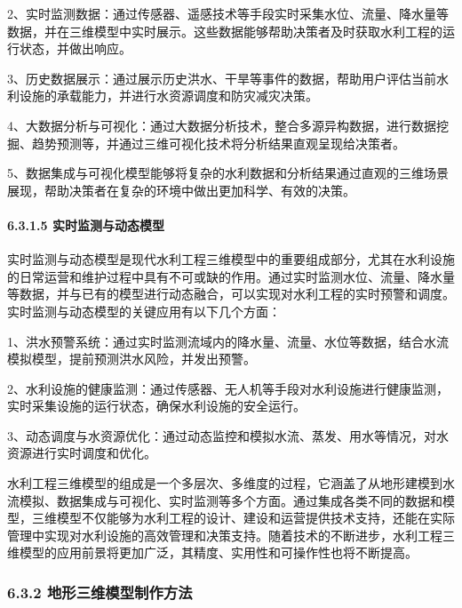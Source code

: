 2、实时监测数据：通过传感器、遥感技术等手段实时采集水位、流量、降水量等数据，并在三维模型中实时展示。这些数据能够帮助决策者及时获取水利工程的运行状态，并做出响应。

3、历史数据展示：通过展示历史洪水、干旱等事件的数据，帮助用户评估当前水利设施的承载能力，并进行水资源调度和防灾减灾决策。

4、大数据分析与可视化：通过大数据分析技术，整合多源异构数据，进行数据挖掘、趋势预测等，并通过三维可视化技术将分析结果直观呈现给决策者。

5、数据集成与可视化模型能够将复杂的水利数据和分析结果通过直观的三维场景展现，帮助决策者在复杂的环境中做出更加科学、有效的决策。

\hypertarget{ux5b9eux65f6ux76d1ux6d4bux4e0eux52a8ux6001ux6a21ux578b}{%
\paragraph{6.3.1.5 实时监测与动态模型}\label{ux5b9eux65f6ux76d1ux6d4bux4e0eux52a8ux6001ux6a21ux578b}}

实时监测与动态模型是现代水利工程三维模型中的重要组成部分，尤其在水利设施的日常运营和维护过程中具有不可或缺的作用。通过实时监测水位、流量、降水量等数据，并与已有的模型进行动态融合，可以实现对水利工程的实时预警和调度。实时监测与动态模型的关键应用有以下几个方面：

1、洪水预警系统：通过实时监测流域内的降水量、流量、水位等数据，结合水流模拟模型，提前预测洪水风险，并发出预警。

2、水利设施的健康监测：通过传感器、无人机等手段对水利设施进行健康监测，实时采集设施的运行状态，确保水利设施的安全运行。

3、动态调度与水资源优化：通过动态监控和模拟水流、蒸发、用水等情况，对水资源进行实时调度和优化。

水利工程三维模型的组成是一个多层次、多维度的过程，它涵盖了从地形建模到水流模拟、数据集成与可视化、实时监测等多个方面。通过集成各类不同的数据和模型，三维模型不仅能够为水利工程的设计、建设和运营提供技术支持，还能在实际管理中实现对水利设施的高效管理和决策支持。随着技术的不断进步，水利工程三维模型的应用前景将更加广泛，其精度、实用性和可操作性也将不断提高。

\hypertarget{ux5730ux5f62ux4e09ux7ef4ux6a21ux578bux5236ux4f5cux65b9ux6cd5}{%
\subsubsection{6.3.2 地形三维模型制作方法}\label{ux5730ux5f62ux4e09ux7ef4ux6a21ux578bux5236ux4f5cux65b9ux6cd5}}

